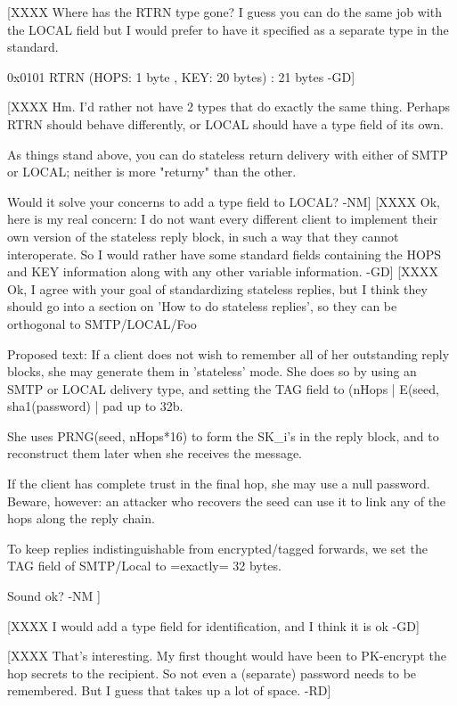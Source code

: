 [XXXX Where has the RTRN type gone? I guess you can do the same job
with the LOCAL field but I would prefer to have it specified as a
separate type in the standard. 

0x0101 RTRN  (HOPS: 1 byte , KEY: 20 bytes) : 21 bytes -GD]

[XXXX Hm.  I'd rather not have 2 types that do exactly the same thing.
      Perhaps RTRN should behave differently, or LOCAL should have a
      type field of its own.

      As things stand above, you can do stateless return delivery with
      either of SMTP or LOCAL; neither is more "returny" than the other.

      Would it solve your concerns to add a type field to LOCAL? -NM]
[XXXX Ok, here is my real concern: I do not want every different client
      to implement their own version of the stateless reply block, in
such a way that they cannot interoperate. So I would rather have some 
standard fields containing the HOPS and KEY information along with any
other variable information. -GD]
[XXXX Ok, I agree with your goal of standardizing stateless replies,
      but I think they should go into a section on 'How to do
      stateless replies', so they can be orthogonal to SMTP/LOCAL/Foo  

      Proposed text:
         If a client does not wish to remember all of her outstanding
         reply blocks, she may generate them in 'stateless' mode.  She  
         does so by using an SMTP or LOCAL delivery type, and setting
         the TAG field to 
              (nHops | E(seed, sha1(password) | pad up to 32b.

         She uses PRNG(seed, nHops*16) to form the SK_i's in the reply
         block, and to reconstruct them later when she receives the 
         message.
       
         If the client has complete trust in the final hop, she may
         use a null password.  Beware, however: an attacker who recovers 
         the seed can use it to link any of the hops along the reply 
         chain.

	 To keep replies indistinguishable from encrypted/tagged
         forwards, we set the TAG field of SMTP/Local to =exactly=
         32 bytes.

         Sound ok?                                 -NM ]

[XXXX I would add a type field for identification, and I think it is
ok -GD]

[XXXX That's interesting. My first thought would have been to PK-encrypt
      the hop secrets to the recipient. So not even a (separate) password
      needs to be remembered. But I guess that takes up a lot of
      space. -RD]

